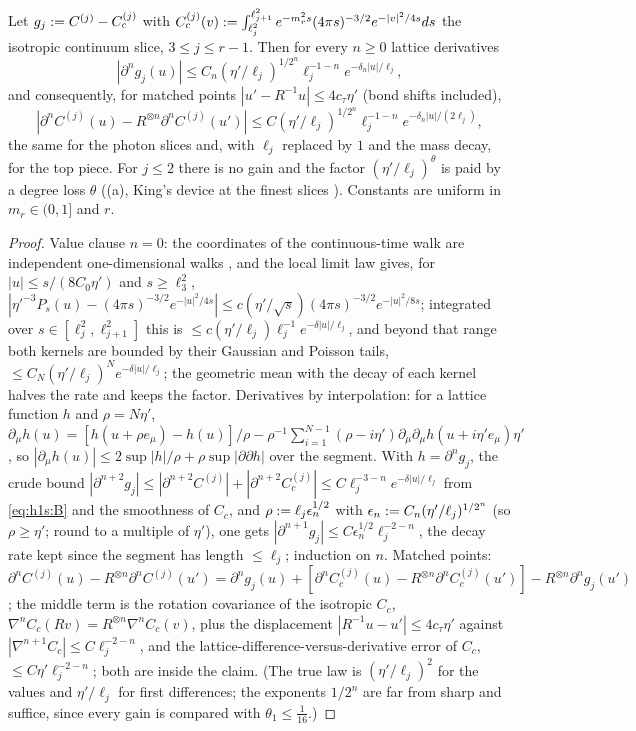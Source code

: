 \begin{lemma}\label{rot:h1s:P}
Let $g_j:= C^{(j)}-C^{(j)}_c$ with $C^{(j)}_c(v):=\int_{\ell_j^2}^{\ell_{j+1}^2}e^{-m_r^2s}(4\pi s)^{-3/2}e^{-|v|^2/4s}ds$ the isotropic continuum slice, $3\le j\le r-1$. Then for every $n\ge0$ lattice derivatives
\[
|\partial^ng_j(u)|\le C_n(\eta'/\ell_j)^{1/2^n}\ell_j^{-1-n}e^{-\delta_n|u|/\ell_j},
\]
and consequently, for matched points $|u'-R^{-1}u|\le4c_\tau\eta'$ (bond shifts included),
\[
|\partial^nC^{(j)}(u)-R^{\otimes n}\partial^nC^{(j)}(u')|\le C(\eta'/\ell_j)^{1/2^n}\ell_j^{-1-n}e^{-\delta_n|u|/(2\ell_j)},
\]
the same for the photon slices and, with $\ell_j$ replaced by $1$ and the mass decay, for the top piece. For $j\le2$ there is no gain and the factor $(\eta'/\ell_j)^\theta$ is paid by a degree loss $\theta$ ((a), King's device at the finest slices \cite[p.~675]{K1}). Constants are uniform in $m_r\in(0,1]$ and $r$.
\end{lemma}
\begin{proof}
Value clause $n=0$: the coordinates of the continuous-time walk are independent one-dimensional walks \cite[Prop.~1.2.2]{LL10}, and the local limit law \cite[Thm.~2.5.6]{LL10} gives, for $|u|\le s/(8C_0\eta')$ and $s\ge\ell_3^2$, $|\eta'^{-3}P_s(u)-(4\pi s)^{-3/2}e^{-|u|^2/4s}|\le c(\eta'/\sqrt s)(4\pi s)^{-3/2}e^{-|u|^2/8s}$; integrated over $s\in[\ell_j^2,\ell_{j+1}^2]$ this is $\le c(\eta'/\ell_j)\ell_j^{-1}e^{-\delta|u|/\ell_j}$, and beyond that range both kernels are bounded by their Gaussian and Poisson tails, $\le C_N(\eta'/\ell_j)^Ne^{-\delta|u|/\ell_j}$; the geometric mean with the decay of each kernel halves the rate and keeps the factor. Derivatives by interpolation: for a lattice function $h$ and $\rho=N\eta'$, $\partial_\mu h(u)=[h(u+\rho e_\mu)-h(u)]/\rho-\rho^{-1}\sum_{i=1}^{N-1}(\rho-i\eta')\partial_\mu\partial_\mu h(u+i\eta'e_\mu)\eta'$, so $|\partial_\mu h(u)|\le2\sup|h|/\rho+\rho\sup|\partial\partial h|$ over the segment. With $h=\partial^ng_j$, the crude bound $|\partial^{n+2}g_j|\le|\partial^{n+2}C^{(j)}|+|\partial^{n+2}C_c^{(j)}|\le C\ell_j^{-3-n}e^{-\delta|u|/\ell_j}$ from \eqref{eq:h1s:B} and the smoothness of $C_c$, and $\rho:=\ell_j\epsilon_n^{1/2}$ with $\epsilon_n:= C_n(\eta'/\ell_j)^{1/2^n}$ (so $\rho\ge\eta'$; round to a multiple of $\eta'$), one gets $|\partial^{n+1}g_j|\le C\epsilon_n^{1/2}\ell_j^{-2-n}$, the decay rate kept since the segment has length $\le\ell_j$; induction on $n$. Matched points: $\partial^nC^{(j)}(u)-R^{\otimes n}\partial^nC^{(j)}(u')=\partial^ng_j(u)+[\partial^nC_c^{(j)}(u)-R^{\otimes n}\partial^nC^{(j)}_c(u')]-R^{\otimes n}\partial^ng_j(u')$; the middle term is the rotation covariance of the isotropic $C_c$, $\nabla^nC_c(Rv)=R^{\otimes n}\nabla^nC_c(v)$, plus the displacement $|R^{-1}u-u'|\le4c_\tau\eta'$ against $|\nabla^{n+1}C_c|\le C\ell_j^{-2-n}$, and the lattice-difference-versus-derivative error of $C_c$, $\le C\eta'\ell_j^{-2-n}$; both are inside the claim. (The true law is $(\eta'/\ell_j)^2$ for the values and $\eta'/\ell_j$ for first differences; the exponents $1/2^n$ are far from sharp and suffice, since every gain is compared with $\theta_1\le\frac1{16}$.)
\end{proof}

